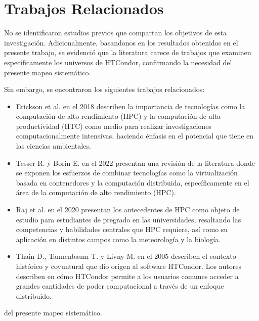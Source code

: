 \section{Trabajos Relacionados}\label{sec:trabajos-relacionados}

No se identificaron estudios previos que compartan los objetivos de
esta investigación. Adicionalmente, basandonos en los resultados obtenidos
en el presente trabajo, se evidenció que la literatura carece de trabajos
que examinen específicamente los universos de HTCondor, confirmando
la necesidad del presente mapeo sistemático.

Sin embargo, se encontraron los siguientes trabajos relacionados:

\begin{itemize}[label=--]
        \item Erickson et al. en el 2018 \cite{EricksonA-01} describen la importancia de tecnologías como la computación
              de alto rendimiento (HPC) y la computación de alta productividad (HTC) como medio para
              realizar investigaciones computacionalmente intensivas, haciendo énfasis en el potencial
              que tiene en las ciencias ambientales.

        \item Tesser R. y Borin E. en el 2022 \cite{KellerTesser2023} presentan una revisión de la literatura
              donde se exponen los esfuerzos de combinar tecnologías como la virtualización basada
              en contenedores y la computación distribuida, específicamente en el área de la computación
              de alto rendimiento (HPC).

        \item Raj et al. en el 2020 \cite{RajRomanowski2020} presentan los antecedentes de HPC como objeto de estudio para estudiantes de pregrado en las universidades,
              resaltando las competencias y habilidades centrales que HPC requiere, así como su aplicación en distintos campos como la meteorología
              y la biología.

        \item Thain D., Tannenbaum T. y Livny M. en el 2005 \cite{Livny-Tannenbaum2005} describen el contexto histórico y coyuntural que dio
              origen al software HTCondor. Los autores describen en cómo HTCondor permite a los usuarios comunes
              acceder a grandes cantidades de poder computacional a través de un enfoque distribuido.
\end{itemize}del presente mapeo sistemático.
